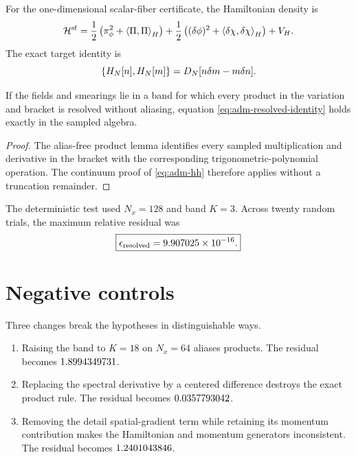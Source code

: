 For the one-dimensional scalar-fiber certificate, the Hamiltonian density is
\begin{equation}
\mathcal H^{\mathrm{sf}}
=\frac12\left(\pi_\phi^2+\left\langle \Pi,\Pi\right\rangle_H\right)
+\frac12\left((\delta\phi)^2+\left\langle \delta\chi,\delta\chi\right\rangle_H\right)
+V_H.
\label{eq:adm-1d-density}
\end{equation}
The exact target identity is
\begin{equation}
\left\{H_N[n],H_N[m]\right\}
=D_N[n\delta m-m\delta n].
\label{eq:adm-resolved-identity}
\end{equation}

\begin{proposition}
If the fields and smearings lie in a band for which every product in the variation and bracket is resolved without aliasing, equation \eqref{eq:adm-resolved-identity} holds exactly in the sampled algebra.
\end{proposition}

\begin{proof}
The alias-free product lemma identifies every sampled multiplication and derivative in the bracket with the corresponding trigonometric-polynomial operation.  The continuum proof of \eqref{eq:adm-hh} therefore applies without a truncation remainder.
\end{proof}

The deterministic test used $N_x=128$ and band $K=3$.  Across twenty random trials, the maximum relative residual was
\begin{equation}
\boxed{\epsilon_{\mathrm{resolved}}=9.907025\times 10^{-16}.}
\label{eq:adm-resolved-residual}
\end{equation}

\section{Negative controls}

Three changes break the hypotheses in distinguishable ways.
\begin{enumerate}[leftmargin=2.2em]
\item Raising the band to $K=18$ on $N_x=64$ aliases products.  The residual becomes $1.8994349731$.
\item Replacing the spectral derivative by a centered difference destroys the exact product rule.  The residual becomes $0.0357793042$.
\item Removing the detail spatial-gradient term while retaining its momentum contribution makes the Hamiltonian and momentum generators inconsistent.  The residual becomes $1.2401043846$.
\end{enumerate}

